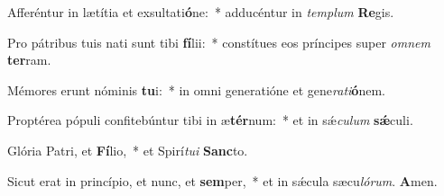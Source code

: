 \item Afferéntur in lætítia et exsultati\textbf{ó}ne:~* adducéntur in \textit{tem}\textit{plum} \textbf{Re}gis.
\item Pro pátribus tuis nati sunt tibi \textbf{fí}lii:~* constítues eos príncipes super \textit{om}\textit{nem} \textbf{ter}ram.
\item Mémores erunt nóminis \textbf{tu}i:~* in omni generatióne et gene\textit{ra}\textit{ti}\textbf{ó}nem.
\item Proptérea pópuli confitebúntur tibi in æ\textbf{tér}num:~* et in sǽ\textit{cu}\textit{lum} \textbf{sǽ}culi.
\item Glória Patri, et \textbf{Fí}lio,~* et Spirí\textit{tu}\textit{i} \textbf{Sanc}to.
\item Sicut erat in princípio, et nunc, et \textbf{sem}per,~* et in sǽcula sæcu\textit{ló}\textit{rum}. \textbf{A}men.
